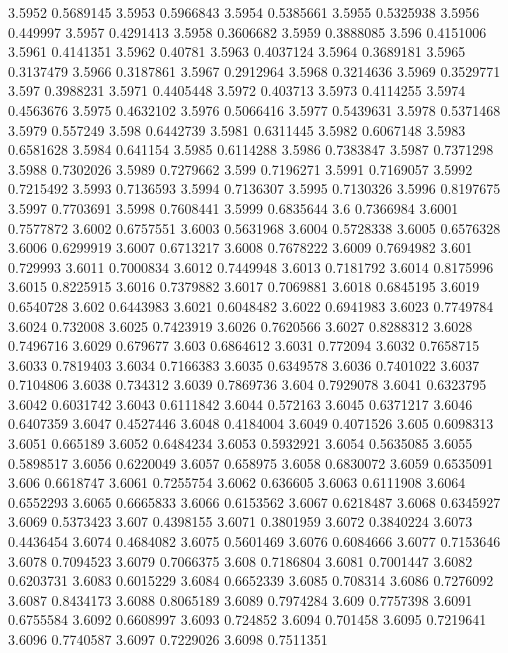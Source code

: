 3.5952  0.5689145
3.5953  0.5966843
3.5954  0.5385661
3.5955  0.5325938
3.5956  0.449997
3.5957  0.4291413
3.5958  0.3606682
3.5959  0.3888085
3.596  0.4151006
3.5961  0.4141351
3.5962  0.40781
3.5963  0.4037124
3.5964  0.3689181
3.5965  0.3137479
3.5966  0.3187861
3.5967  0.2912964
3.5968  0.3214636
3.5969  0.3529771
3.597  0.3988231
3.5971  0.4405448
3.5972  0.403713
3.5973  0.4114255
3.5974  0.4563676
3.5975  0.4632102
3.5976  0.5066416
3.5977  0.5439631
3.5978  0.5371468
3.5979  0.557249
3.598  0.6442739
3.5981  0.6311445
3.5982  0.6067148
3.5983  0.6581628
3.5984  0.641154
3.5985  0.6114288
3.5986  0.7383847
3.5987  0.7371298
3.5988  0.7302026
3.5989  0.7279662
3.599  0.7196271
3.5991  0.7169057
3.5992  0.7215492
3.5993  0.7136593
3.5994  0.7136307
3.5995  0.7130326
3.5996  0.8197675
3.5997  0.7703691
3.5998  0.7608441
3.5999  0.6835644
3.6  0.7366984
3.6001  0.7577872
3.6002  0.6757551
3.6003  0.5631968
3.6004  0.5728338
3.6005  0.6576328
3.6006  0.6299919
3.6007  0.6713217
3.6008  0.7678222
3.6009  0.7694982
3.601  0.729993
3.6011  0.7000834
3.6012  0.7449948
3.6013  0.7181792
3.6014  0.8175996
3.6015  0.8225915
3.6016  0.7379882
3.6017  0.7069881
3.6018  0.6845195
3.6019  0.6540728
3.602  0.6443983
3.6021  0.6048482
3.6022  0.6941983
3.6023  0.7749784
3.6024  0.732008
3.6025  0.7423919
3.6026  0.7620566
3.6027  0.8288312
3.6028  0.7496716
3.6029  0.679677
3.603  0.6864612
3.6031  0.772094
3.6032  0.7658715
3.6033  0.7819403
3.6034  0.7166383
3.6035  0.6349578
3.6036  0.7401022
3.6037  0.7104806
3.6038  0.734312
3.6039  0.7869736
3.604  0.7929078
3.6041  0.6323795
3.6042  0.6031742
3.6043  0.6111842
3.6044  0.572163
3.6045  0.6371217
3.6046  0.6407359
3.6047  0.4527446
3.6048  0.4184004
3.6049  0.4071526
3.605  0.6098313
3.6051  0.665189
3.6052  0.6484234
3.6053  0.5932921
3.6054  0.5635085
3.6055  0.5898517
3.6056  0.6220049
3.6057  0.658975
3.6058  0.6830072
3.6059  0.6535091
3.606  0.6618747
3.6061  0.7255754
3.6062  0.636605
3.6063  0.6111908
3.6064  0.6552293
3.6065  0.6665833
3.6066  0.6153562
3.6067  0.6218487
3.6068  0.6345927
3.6069  0.5373423
3.607  0.4398155
3.6071  0.3801959
3.6072  0.3840224
3.6073  0.4436454
3.6074  0.4684082
3.6075  0.5601469
3.6076  0.6084666
3.6077  0.7153646
3.6078  0.7094523
3.6079  0.7066375
3.608  0.7186804
3.6081  0.7001447
3.6082  0.6203731
3.6083  0.6015229
3.6084  0.6652339
3.6085  0.708314
3.6086  0.7276092
3.6087  0.8434173
3.6088  0.8065189
3.6089  0.7974284
3.609  0.7757398
3.6091  0.6755584
3.6092  0.6608997
3.6093  0.724852
3.6094  0.701458
3.6095  0.7219641
3.6096  0.7740587
3.6097  0.7229026
3.6098  0.7511351
